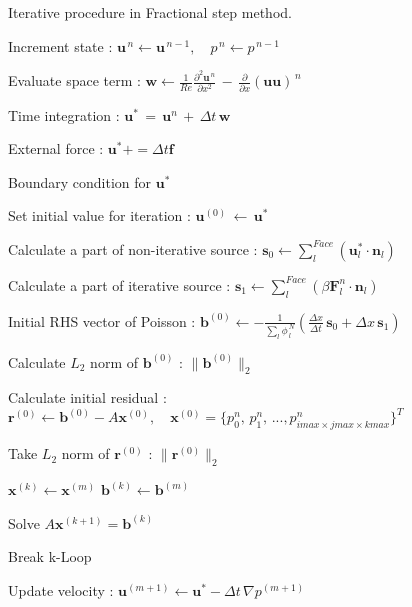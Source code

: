 \begin{algorithm}
\caption{Iterative procedure in Fractional step method.}
\label{algo:FS}
\begin{algorithmic}

\State Increment state : $\bm{u}^{\,n} \gets  \bm{u}^{\,n-1}, \quad p^{\,n} \gets  p^{\,n-1}$

\State Evaluate space term : $\displaystyle{ \bm{w} \gets \frac{1}{Re} \frac{\partial^2 \bm{u}^{\,n}}{\partial x^2} \,-\, \frac{\partial}{\partial x} (\bm{u} \bm{u})^{\,n} }$

\State Time integration : $\bm{u}^* \,=\, \bm{u}^n \,+\, \Delta t \, \bm{w}$

\State External force : $\bm{u}^* += \Delta t \bm{f}$

\State Boundary condition for $\bm{u}^*$

\State Set initial value for iteration : $\bm{u}^{(0)} \,\gets \, \bm{u}^*$

\State Calculate a part of non-iterative source : $ \displaystyle{ \bm{s}_0 \gets \sum \limits_l^{Face} \left( \bm{u}^*_l \cdot \bm{n}_l \right) }$

\State Calculate a part of iterative source : $\bm{s}_1 \gets \sum \limits_l^{Face} \left( \beta \bm{F}_l^n \cdot \bm{n}_l \right)$

\State Initial RHS vector of Poisson : $ \displaystyle{ \bm{b}^{(0)} \gets - \frac{1}{\sum \limits_l \phi^{\,N}_{\,l}} \left( \frac{\Delta x}{\Delta t} \, \bm{s}_0 + \Delta x \, \bm{s}_1 \right) }$

\State Calculate $L_2$ norm of $\bm{b}^{(0)}$ : $\| \bm{b}^{(0)} \|_2$

\State Calculate initial residual : $ \bm{r}^{(0)} \gets \bm{b}^{(0)} -A \bm{x}^{(0)}, \quad \bm{x}^{(0)} = \{p^n_0,\,p^n_1,\,...,p^n_{imax \times jmax \times kmax}\}^T$

\State Take $L_2$ norm of $\bm{r}^{(0)}$ : $\| \bm{r}^{(0)} \|_2$


\State $\bm{x}^{(k)} \gets \bm{x}^{(m)}$
\State $\bm{b}^{(k)} \gets \bm{b}^{(m)}$


\State Solve $A \bm{x}^{(k+1)} = \bm{b}^{(k)}$

\State Break k-Loop
\EndIf

\EndFor

\State Update velocity : $\bm{u}^{(m+1)} \gets \bm{u}^* - \Delta t \,\nabla p^{(m+1)}$


\end{algorithmic}
\end{algorithm}
